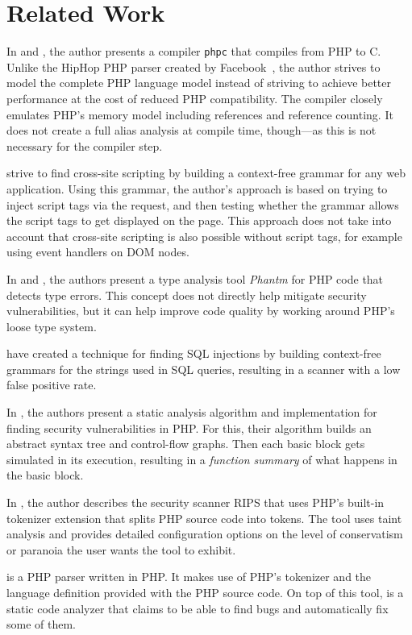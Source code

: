 \chapter{Related Work}
\label{related-work}

In \cite{phpc-thesis} and \cite{phpc-paper}, the author presents a compiler \texttt{phpc} that compiles from PHP to C. Unlike the HipHop PHP parser created by Facebook~\cite{hiphop}, the author strives to model the complete PHP language model instead of striving to achieve better performance at the cost of reduced PHP compatibility. The compiler closely emulates PHP's memory model including references and reference counting. It does not create a full alias analysis at compile time, though---as this is not necessary for the compiler step.

\cite{xss-via-grammar} strive to find cross-site scripting by building a context-free grammar for any web application. Using this grammar, the author's approach is based on trying to inject script tags via the request, and then testing whether the grammar allows the script tags to get displayed on the page. This approach does not take into account that cross-site scripting is also possible without script tags, for example using event handlers on DOM nodes.

In \cite{phantom-1} and \cite{phantom-2}, the authors present a type analysis tool \emph{Phantm} for PHP code that detects type errors. This concept does not directly help mitigate security vulnerabilities, but it can help improve code quality by working around PHP's loose type system.

\cite{wassermann-sound} have created a technique for finding SQL injections by building context-free grammars for the strings used in SQL queries, resulting in a scanner with a low false positive rate.

In \cite{static-php}, the authors present a static analysis algorithm and implementation for finding security vulnerabilities in PHP. For this, their algorithm builds an abstract syntax tree and control-flow graphs. Then each basic block gets simulated in its execution, resulting in a \emph{function summary} of what happens in the basic block.

In \cite{rips}, the author describes the security scanner RIPS that uses PHP's built-in tokenizer extension that splits PHP source code into tokens. The tool uses taint analysis and provides detailed configuration options on the level of conservatism or paranoia the user wants the tool to exhibit.

\cite{php-parser-popov} is a PHP parser written in PHP. It makes use of PHP's tokenizer and the language definition provided with the PHP source code. On top of this tool, \cite{php-analyzer} is a static code analyzer that claims to be able to find bugs and automatically fix some of them.
